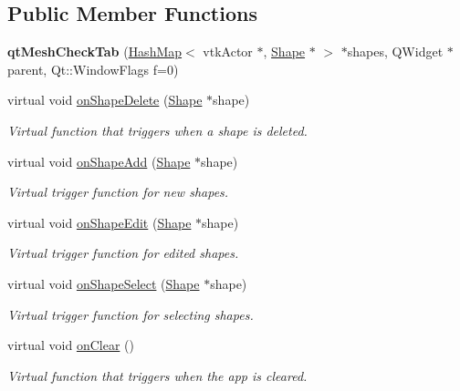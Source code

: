\subsection*{Public Member Functions}
\begin{DoxyCompactItemize}
\item 
\hypertarget{classqt_mesh_check_tab_a8a976c8d86aabd648ca0397326b8e730}{}{\bfseries qt\+Mesh\+Check\+Tab} (\hyperlink{class_hash_map}{Hash\+Map}$<$ vtk\+Actor $\ast$, \hyperlink{class_shape}{Shape} $\ast$ $>$ $\ast$shapes, Q\+Widget $\ast$parent, Qt\+::\+Window\+Flags f=0)\label{classqt_mesh_check_tab_a8a976c8d86aabd648ca0397326b8e730}

\item 
virtual void \hyperlink{classqt_mesh_check_tab_aa1f583fbc0604f8c34528efd581e0633}{on\+Shape\+Delete} (\hyperlink{class_shape}{Shape} $\ast$shape)
\begin{DoxyCompactList}\small\item\em Virtual function that triggers when a shape is deleted. \end{DoxyCompactList}\item 
virtual void \hyperlink{classqt_mesh_check_tab_a8182eeedc7be66ea9d377011ace81125}{on\+Shape\+Add} (\hyperlink{class_shape}{Shape} $\ast$shape)
\begin{DoxyCompactList}\small\item\em Virtual trigger function for new shapes. \end{DoxyCompactList}\item 
virtual void \hyperlink{classqt_mesh_check_tab_a01aea7b3fd612932b7a19b244b4b44a0}{on\+Shape\+Edit} (\hyperlink{class_shape}{Shape} $\ast$shape)
\begin{DoxyCompactList}\small\item\em Virtual trigger function for edited shapes. \end{DoxyCompactList}\item 
virtual void \hyperlink{classqt_mesh_check_tab_a72ed8ca09f9100689a41dec77523bf4e}{on\+Shape\+Select} (\hyperlink{class_shape}{Shape} $\ast$shape)
\begin{DoxyCompactList}\small\item\em Virtual trigger function for selecting shapes. \end{DoxyCompactList}\item 
virtual void \hyperlink{classqt_mesh_check_tab_a5ca41a6c3c905f572632a2b754f86b7c}{on\+Clear} ()
\begin{DoxyCompactList}\small\item\em Virtual function that triggers when the app is cleared. \end{DoxyCompactList}\end{DoxyCompactItemize}
